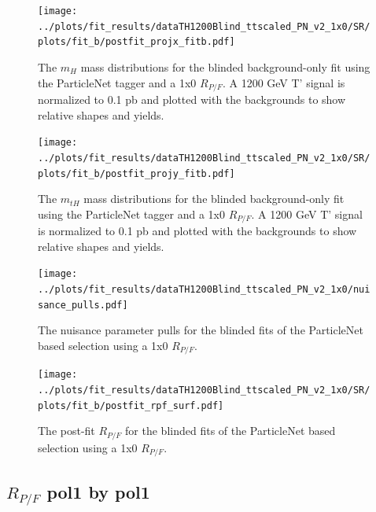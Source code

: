 \documentclass[10pt,oneside]{article}
\begin{document}
\begin{figure}[H]
    \centering
    \texttt{[image: ../plots/fit\_results/dataTH1200Blind\_ttscaled\_PN\_v2\_1x0/SR/plots/fit\_b/postfit\_projx\_fitb.pdf]}
    \caption{The $m_H$ mass distributions for the blinded background-only fit using the ParticleNet tagger and a 1x0 $R_{P/F}$.
    A 1200 GeV T' signal is normalized to 0.1 pb and plotted with the backgrounds to show relative shapes and yields.}
    \label{figs:PN_mh_1x0}
\end{figure}
\begin{figure}[H]
    \centering
    \texttt{[image: ../plots/fit\_results/dataTH1200Blind\_ttscaled\_PN\_v2\_1x0/SR/plots/fit\_b/postfit\_projy\_fitb.pdf]}
    \caption{The $m_{tH}$ mass distributions for the blinded background-only fit using the ParticleNet tagger and a 1x0 $R_{P/F}$.
    A 1200 GeV T' signal is normalized to 0.1 pb and plotted with the backgrounds to show relative shapes and yields.}
    \label{figs:PN_mth_1x0}
\end{figure}
\begin{figure}[H]
    \centering
    \texttt{[image: ../plots/fit\_results/dataTH1200Blind\_ttscaled\_PN\_v2\_1x0/nuisance\_pulls.pdf]}
    \caption{The nuisance parameter pulls for the blinded fits of the ParticleNet based selection using a 1x0 $R_{P/F}$.}
    \label{figs:PN_nuis_1x0}
\end{figure}
\begin{figure}[H]
    \centering
    \texttt{[image: ../plots/fit\_results/dataTH1200Blind\_ttscaled\_PN\_v2\_1x0/SR/plots/fit\_b/postfit\_rpf\_surf.pdf]}
    \caption{The post-fit $R_{P/F}$ for the blinded fits of the ParticleNet based selection using a 1x0 $R_{P/F}$.}
    \label{figs:PN_rpf_1x0}
\end{figure}

\subsection{\texorpdfstring{$R_{P/F}$}{Rpf} pol1 by pol1}
\end{document}

